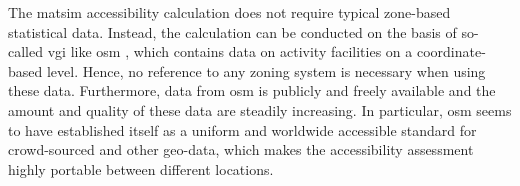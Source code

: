 The \gls{matsim} accessibility calculation does not require typical zone-based statistical data. Instead, the
calculation can be conducted on the basis of so-called \gls{vgi} like \gls{osm}%
, which contains data on activity facilities on a coordinate-based level. Hence, no reference to any zoning
system is necessary when using these data. Furthermore, data from \gls{osm} is publicly and freely available 
and the amount and quality of these data are steadily increasing. In particular, \gls{osm} seems to have 
established itself as a uniform and worldwide accessible standard for crowd-sourced and other geo-data, 
which makes the accessibility assessment highly portable between different locations.

%
